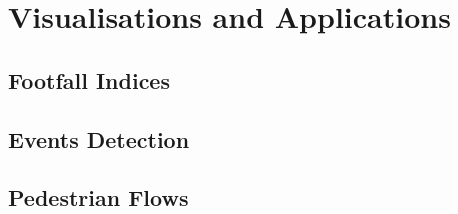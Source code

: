 \chapter{Visualisations and Applications}

\section{Footfall Indices}

\section{Events Detection}

\section{Pedestrian Flows}
